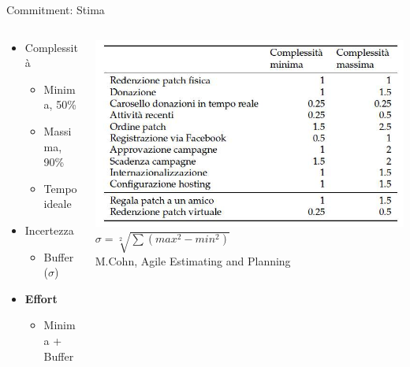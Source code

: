 	\begin{frame}{Commitment: Stima}
		
		\begin{columns}[T]
		   \begin{column}{.5\textwidth}

			\begin{itemize}
				\item Complessità
				\begin{itemize}
					\item Minima, 50\%
					\item Massima, 90\%
					\item Tempo ideale
				\end{itemize}
				\item Incertezza
				\begin{itemize}
					\item Buffer ($ \sigma $)
				\end{itemize}
			\end{itemize}

			\begin{itemize}
				\item \textbf{Effort}
				\begin{itemize}
					\item Minima + Buffer
				\end{itemize}
			\end{itemize}

		   \end{column}
		   \begin{column}{.5\textwidth}
				\vspace*{-0.5cm}
				\hspace*{-0.8cm} 
				\includegraphics[scale=0.32]{images/effort} \\
				\vspace*{0.2cm}
				{\small $ \sigma = \sqrt[2] { \sum \left ( max^{2} - min^{2} \right ) } $} \\
				{\scriptsize M.Cohn, Agile Estimating and Planning}
		   \end{column}
		\end{columns}
		

\end{frame}

